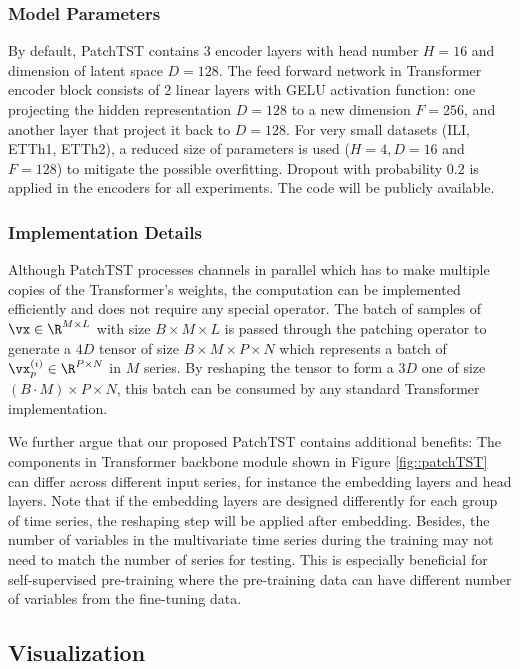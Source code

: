 \documentclass{article} %
\begin{document}
\subsubsection{Model Parameters}

By default, PatchTST contains $3$ encoder layers with head number $H=16$ and dimension of latent space $D=128$. The feed forward network in Transformer encoder block consists of 2 linear layers with GELU \citep{gelu} activation function: one projecting the hidden representation $D=128$ to a new dimension $F=256$, and another layer that project it back to $D=128$. For very small datasets (ILI, ETTh1, ETTh2), a reduced size of parameters is used ($H=4, D=16$ and $F=128$) to mitigate the possible overfitting. Dropout with probability $0.2$ is applied in the encoders for all experiments. The code will be publicly available.

\subsubsection{Implementation Details}
\label{sec::implementation details}

Although PatchTST processes channels in parallel which has to make multiple copies of the Transformer's weights, the computation can be implemented efficiently and does not require any special operator. The batch of samples of $\vx \in \R^{M \times L}$ with size $B \times M \times L$ is passed through the patching operator to generate a $4D$ tensor of size $B \times M \times P \times N$ which represents a batch of $\vx^{(i)}_p \in \R^{P \times N}$ in $M$ series. By reshaping the tensor to form a $3D$ one of size $(B \cdot M) \times P \times N$, this batch can be consumed by any standard Transformer implementation. 

We further argue that our proposed PatchTST contains additional benefits: The components in Transformer backbone module shown in Figure \ref{fig::patchTST} can differ across different input series, for instance the embedding layers and head layers. Note that if the embedding layers are designed differently for each group of time series, the reshaping step will be applied after embedding. Besides, the number of variables in the multivariate time series during the training may not need to match the number of series for testing. This is especially beneficial for self-supervised pre-training where the pre-training data can have different number of variables from the fine-tuning data. 

\subsection{Visualization}
\end{document}
